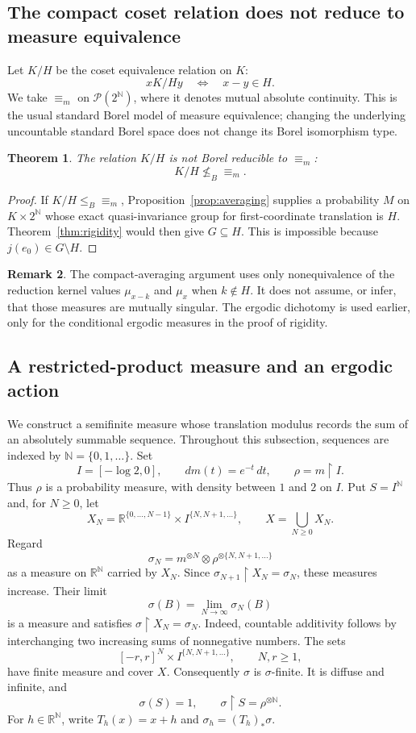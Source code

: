\documentclass[11pt]{article}
\numberwithin{equation}{section}
\newtheorem{theorem}{Theorem}[section]
\theoremstyle{definition}
\newtheorem{remark}[theorem]{Remark}
\newcommand{\N}{\mathbb N}
\newcommand{\R}{\mathbb R}
\newcommand{\Prob}{\mathcal P}
\newcommand{\ME}{\mathrel{\equiv_m}}
\newcommand{\leB}{\mathrel{\leq_B}}
\newcommand{\nleB}{\mathrel{\nleq_B}}
\begin{document}
\subsection{The compact coset relation does not reduce to measure equivalence}
\label{sec:coset-nonreduction}

Let $K/H$ be the coset equivalence relation on $K$:
\[
 x\mathrel{K/H}y\quad\Longleftrightarrow\quad x-y\in H.
\]
We take $\ME$ on $\Prob(2^{\N})$, where it denotes mutual absolute
continuity. This is the usual standard Borel model of measure
equivalence; changing the underlying uncountable standard Borel space
does not change its Borel isomorphism type.

\begin{theorem}\label{thm:nonreduction}
The relation $K/H$ is not Borel reducible to $\ME$:
\[
 K/H\nleB\ME.
\]
\end{theorem}

\begin{proof}
If $K/H\leB{\equiv_m}$, Proposition~\ref{prop:averaging} supplies a
probability $M$ on $K\times2^\N$ whose exact quasi-invariance group
for first-coordinate translation is $H$. Theorem~\ref{thm:rigidity}
would then give $G\subseteq H$. This is impossible because
$j(e_0)\in G\setminus H$.
\end{proof}

\begin{remark}
The compact-averaging argument uses only nonequivalence of the reduction
kernel values $\mu_{x-k}$ and $\mu_x$ when $k\notin H$. It does not
assume, or infer, that those measures
are mutually singular. The ergodic dichotomy is used earlier, only
for the conditional ergodic measures in the proof of rigidity.
\end{remark}
\subsection{A restricted-product measure and an ergodic action}
\label{sec:restricted-product}

We construct a semifinite measure whose translation modulus records the
sum of an absolutely summable sequence. Throughout this subsection, sequences
are indexed by $\N=\{0,1,\ldots\}$.
Set
\[
 I=[-\log 2,0],\qquad dm(t)=e^{-t}\,dt,\qquad \rho=m\mathbin{\upharpoonright}I.
\]
Thus $\rho$ is a probability measure, with density between $1$ and $2$ on
$I$. Put $S=I^{\N}$ and, for $N\geq0$, let
\[
 X_N=\R^{\{0,\ldots,N-1\}}\times I^{\{N,N+1,\ldots\}},
 \qquad X=\bigcup_{N\geq0}X_N.
\]
Regard
\[
 \sigma_N=m^{\otimes N}\otimes\rho^{\otimes\{N,N+1,\ldots\}}
\]
as a measure on $\R^{\N}$ carried by $X_N$. Since
$\sigma_{N+1}\mathbin{\upharpoonright}X_N=\sigma_N$, these measures increase.
Their limit
\[
 \sigma(B)=\lim_{N\to\infty}\sigma_N(B)
\]
is a measure and satisfies $\sigma\mathbin{\upharpoonright}X_N=\sigma_N$.
Indeed, countable additivity follows by interchanging two increasing sums
of nonnegative numbers. The sets
\[
 [-r,r]^N\times I^{\{N,N+1,\ldots\}},\qquad N,r\geq1,
\]
have finite measure and cover $X$. Consequently $\sigma$ is
$\sigma$-finite. It is diffuse and infinite, and
\[
 \sigma(S)=1,\qquad \sigma\mathbin{\upharpoonright}S=\rho^{\otimes\N}.
\]
For $h\in\R^{\N}$, write $T_h(x)=x+h$ and
$\sigma_h=(T_h)_*\sigma$.
\end{document}
